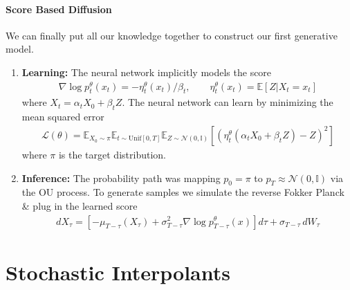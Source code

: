 \paragraph{Score Based Diffusion} We can finally put all our knowledge together to construct our first generative model. 
\begin{enumerate}
	\item \textbf{Learning:} The neural network implicitly models the score
	\begin{align}
		\nabla \log p_t^\theta(x_t) = - \eta_t^\theta(x_t) / \beta_t, \qquad \eta^\theta_t(x_t) = \mathbb E[Z | X_t = x_t]
	\end{align}
	where $X_t = \alpha_t X_0 + \beta_t Z$. The neural network can learn by minimizing the mean squared error
	\begin{align}
		\mathcal L(\theta) = \mathbb E_{X_0 \sim \pi}\mathbb E_{t \sim \text{Unif}[0,T]} \mathbb E_{Z \sim \mathcal N(0, \mathbb I)} [(\eta^\theta_t(\alpha_t X_0 + \beta_t Z) - Z)^2] 
	\end{align}
	where $\pi$ is the target distribution. 
	\item \textbf{Inference:} The probability path was mapping $p_0 = \pi$ to $p_T \approx \mathcal N(0, \mathbb I)$ via the OU process. To generate samples we simulate the reverse Fokker Planck \& plug in the learned score
	\begin{align}
		dX_\tau = [-\mu_{T-\tau}(X_\tau) + \sigma_{T-\tau}^2 \nabla \log p^\theta_{T-\tau}(x)] d\tau + \sigma_{T-\tau} \, dW_\tau
	\end{align} 
\end{enumerate}




\section{Stochastic Interpolants}
